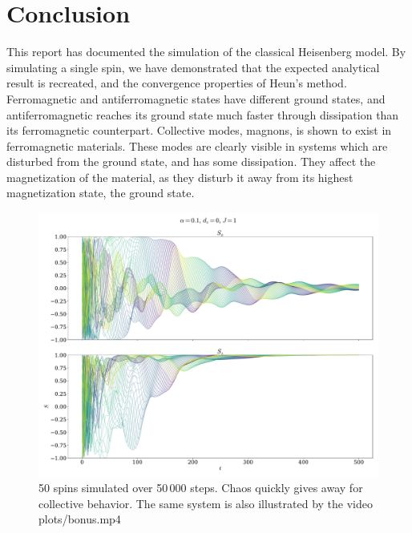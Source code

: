 \documentclass{article}
\begin{document}
    \section*{Conclusion}
    This report has documented the simulation of the classical Heisenberg model. By simulating a single spin, we have demonstrated that the expected analytical result is recreated, and the convergence properties of Heun's method.
    Ferromagnetic and antiferromagnetic states have different ground states, and antiferromagnetic reaches its ground state much faster through dissipation than its ferromagnetic counterpart.
    Collective modes, magnons, is shown to exist in ferromagnetic materials.
    These modes are clearly visible in systems which are disturbed from the ground state, and has some dissipation.
    They affect the magnetization of the material, as they disturb it away from its highest magnetization state, the ground state.

    \printbibliography


    \begin{figure}[H]
        \hspace{- 5 cm}
        \includegraphics[width=1.5\textwidth]{../plots/bonus.pdf}
        \caption{50 spins simulated over 50\,000 steps. Chaos quickly gives away for collective behavior. The same system is also illustrated by the video plots/bonus.mp4}
        \label{50 spins}
    \end{figure}
\end{document}
